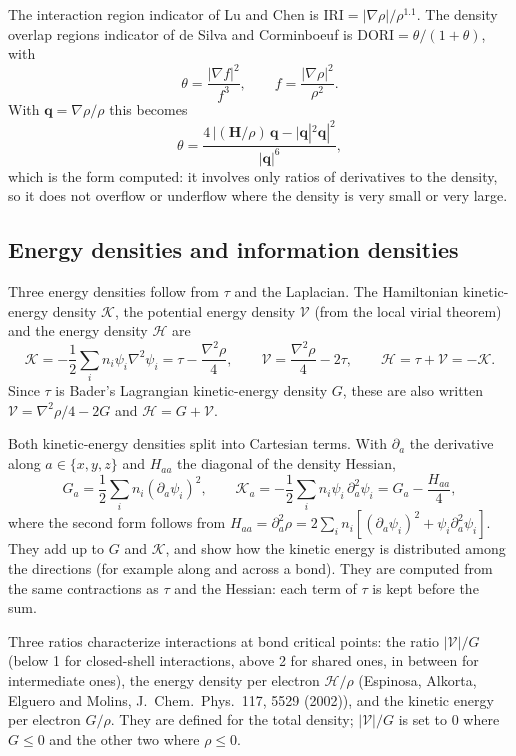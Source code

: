 \documentclass[11pt,a4paper]{article}
\begin{document}
The interaction region indicator of Lu and Chen is
$\mathrm{IRI}=|\nabla\rho|/\rho^{1.1}$. The density overlap regions
indicator of de Silva and Corminboeuf is
$\mathrm{DORI}=\theta/(1+\theta)$, with
\begin{equation}
 \theta=\frac{|\nabla f|^2}{f^3},\qquad f=\frac{|\nabla\rho|^2}{\rho^2}.
\end{equation}
With $\mathbf q=\nabla\rho/\rho$ this becomes
\begin{equation}
 \theta=\frac{4\,|(\mathbf H/\rho)\,\mathbf q-|\mathbf q|^2\mathbf q|^2}{|\mathbf q|^6},
\end{equation}
which is the form computed: it involves only ratios of derivatives to the
density, so it does not overflow or underflow where the density is very
small or very large.

\subsection{Energy densities and information densities}
Three energy densities follow from $\tau$ and the Laplacian. The Hamiltonian
kinetic-energy density $\mathcal K$, the potential energy density
$\mathcal V$ (from the local virial theorem) and the energy density
$\mathcal H$ are
\begin{equation}
 \mathcal K=-\frac12\sum_in_i\psi_i\nabla^2\psi_i=\tau-\frac{\nabla^2\rho}{4},\qquad
 \mathcal V=\frac{\nabla^2\rho}{4}-2\tau,\qquad
 \mathcal H=\tau+\mathcal V=-\mathcal K .
\end{equation}
Since $\tau$ is Bader's Lagrangian kinetic-energy density $G$, these are
also written $\mathcal V=\nabla^2\rho/4-2G$ and $\mathcal H=G+\mathcal V$.

Both kinetic-energy densities split into Cartesian terms. With
$\partial_a$ the derivative along $a\in\{x,y,z\}$ and $H_{aa}$ the
diagonal of the density Hessian,
\begin{equation}
 G_a=\frac12\sum_in_i(\partial_a\psi_i)^2,\qquad
 \mathcal K_a=-\frac12\sum_in_i\psi_i\,\partial_a^2\psi_i=G_a-\frac{H_{aa}}4,
\end{equation}
where the second form follows from
$H_{aa}=\partial_a^2\rho=2\sum_in_i[(\partial_a\psi_i)^2+\psi_i\partial_a^2\psi_i]$.
They add up to $G$ and $\mathcal K$, and show how the kinetic energy is
distributed among the directions (for example along and across a bond).
They are computed from the same contractions as $\tau$ and the Hessian:
each term of $\tau$ is kept before the sum.

Three ratios characterize interactions at bond critical points: the
ratio $|\mathcal V|/G$ (below 1 for closed-shell interactions, above 2 for
shared ones, in between for intermediate ones), the energy density per
electron $\mathcal H/\rho$ (Espinosa, Alkorta, Elguero and Molins,
J.~Chem.\ Phys.\ 117, 5529 (2002)), and the kinetic energy per electron
$G/\rho$. They are defined for the total density; $|\mathcal V|/G$ is set
to 0 where $G\le0$ and the other two where $\rho\le0$.
\end{document}
